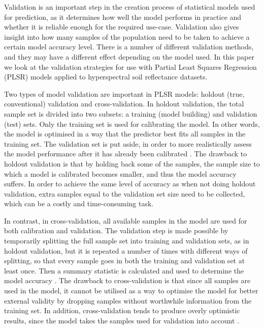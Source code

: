 \documentclass{isprs}
\begin{document}
Validation is an important step in the creation process of statistical models used for prediction, as it determines how well the model performs in practice and whether it is reliable enough for the required use-case. Validation also gives insight into how many samples of the population need to be taken to achieve a certain model accuracy level. There is a number of different validation methods, and they may have a different effect depending on the model used. In this paper we look at the validation strategies for use with Partial Least Squares Regression (PLSR) models applied to hyperspectral soil reflectance datasets.

Two types of model validation are important in PLSR models: holdout (true, conventional) validation and cross-validation. In holdout validation, the total sample set is divided into two subsets: a training (model building) and validation (test) sets. Only the training set is used for calibrating the model. In other words, the model is optimised in a way that the predictor best fits all samples in the training set. The validation set is put aside, in order to more realistically assess the model performance after it has already been calibrated \cite{kohavi1995study}. The drawback to holdout validation is that by holding back some of the samples, the sample size to which a model is calibrated becomes smaller, and thus the model accuracy suffers. In order to achieve the same level of accuracy as when not doing holdout validation, extra samples equal to the validation set size need to be collected, which can be a costly and time-consuming task.

In contrast, in cross-validation, all available samples in the model are used for both calibration and validation. The validation step is made possible by temporarily splitting the full sample set into training and validation sets, as in holdout validation, but it is repeated a number of times with different ways of splitting, so that every sample goes in both the training and validation set at least once. Then a summary statistic is calculated and used to determine the model accuracy \cite{kohavi1995study}. The drawback to cross-validation is that since all samples are used in the model, it cannot be utilised as a way to optimise the model for better external validity by dropping samples without worthwhile information from the training set. In addition, cross-validation tends to produce overly optimistic results, since the model takes the samples used for validation into account \cite{clark2003boosted}.
\end{document}
